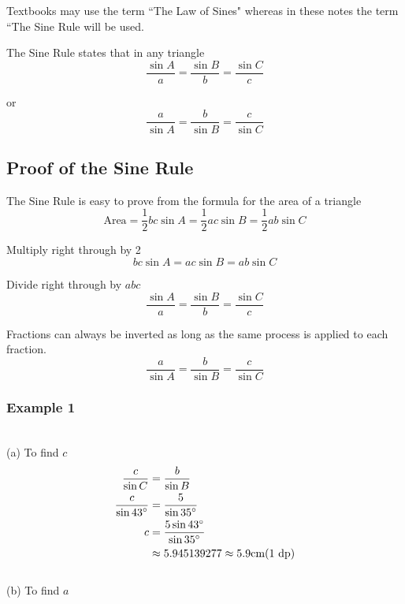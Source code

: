 Textbooks may use the term ``The Law of Sines" whereas in these notes the term
``The Sine Rule will be used. 

The Sine Rule states that in any triangle
\begin{equation*}\frac{\sin  A}{a} =\frac{\sin  B}{b} =\frac{\sin  C}{c}
\end{equation*}

or
\begin{equation*}\frac{a}{\sin  A} =\frac{b}{\sin  B} =\frac{c}{\sin  C}
\end{equation*}

\subsection{Proof of the Sine Rule}
The Sine Rule is easy to prove from the formula for the area of a triangle
\begin{equation*}\text{Area} =\frac{1}{2} b c \sin  A =\frac{1}{2} a c \sin  B =\frac{1}{2} a b \sin  C
\end{equation*}

Multiply right through by 2
\begin{equation*}b c \sin  A =a c \sin  B =a b \sin  C
\end{equation*}

Divide right through by $a b c$
\begin{equation*}\frac{\sin  A}{a} =\frac{\sin  B}{b} =\frac{\sin  C}{c}
\end{equation*}

Fractions can always be inverted as long as the same process is applied to each fraction.
\begin{equation*}\frac{a}{\sin  A} =\frac{b}{\sin  B} =\frac{c}{\sin  C}
\end{equation*}

\subsubsection{Example 1}
   
\setlength\fboxrule{0in}\setlength\fboxsep{0.2in}
\\\relax (a) To find $c$
\begin{align*}\frac{c}{\sin  C} &  = \frac{b}{\sin  B} \\
\frac{c}{\sin  43 \mbox{{\ensuremath{{}^\circ}}}} &  = \frac{5}{\sin  35 \mbox{{\ensuremath{{}^\circ}}}} \\
c &  = \frac{5 \sin  43 \mbox{{\ensuremath{{}^\circ}}}}{\sin  35 \mbox{{\ensuremath{{}^\circ}}}} \\
 &  \approx   5.945139277 \approx 5.9 \mbox{cm}\text{(1 dp)}\end{align*} \\\relax (b) To find $a$ 

